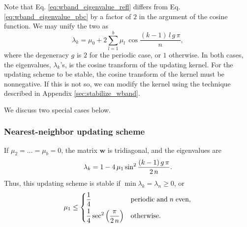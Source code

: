\documentclass[reprint, floatfix]{revtex4-1}
\begin{document}
Note that Eq. \eqref{eq:wband_eigenvalue_refl}
differs from Eq. \eqref{eq:wband_eigenvalue_pbc}
by a factor of $2$
in the argument of the cosine function.
%
We may unify the two as
%
\begin{equation}
  \lambda_k
  =
  \mu_0
  +
  2
  \sum_{ l = 1 }^b
    \mu_l \,
    \cos \frac{ (k - 1) \, l \, g \, \pi }
              {            n             }
  ,
  \label{eq:wband_eigenvalue}
\end{equation}
%
where the degeneracy $g$ is $2$
for the periodic case,
or $1$ otherwise.
%
In both cases,
the eigenvalues, $\lambda_k$'s,
is the cosine transform of
the updating kernel.
%
For the updating scheme to be stable,
the cosine transform of the kernel
must be nonnegative.
%
If this is not so,
we can modify the kernel
using the technique described
in Appendix \ref{sec:stabilize_wband}.

We discuss two special cases below.



\subsubsection{\label{sec:nnscheme}
Nearest-neighbor updating scheme}



If $\mu_2 = \dots = \mu_b = 0$,
the matrix $\mathbf w$ is tridiagonal,
and the eigenvalues are
\begin{equation}
  \lambda_k
  =
  1 -
  4 \, \mu_1 \sin^2
  \frac{ (k - 1) \, g \, \pi }
       {       2 \, n        }
  .
\notag
\end{equation}
%
Thus, this updating scheme is stable if
$\min \lambda_k = \lambda_n \ge 0$,
or
\begin{equation}
  \mu_1 \le
  \begin{dcases}
    \frac 1 4
    & \mathrm{periodic \; and \;} n \mathrm{ \; even,}
    \\
    \frac 1 4
    \sec^2
    \left( \frac{  \pi   }
                { 2 \, n }
    \right)
    & \mathrm{otherwise}.
  \end{dcases}
\notag
\end{equation}
\end{document}
